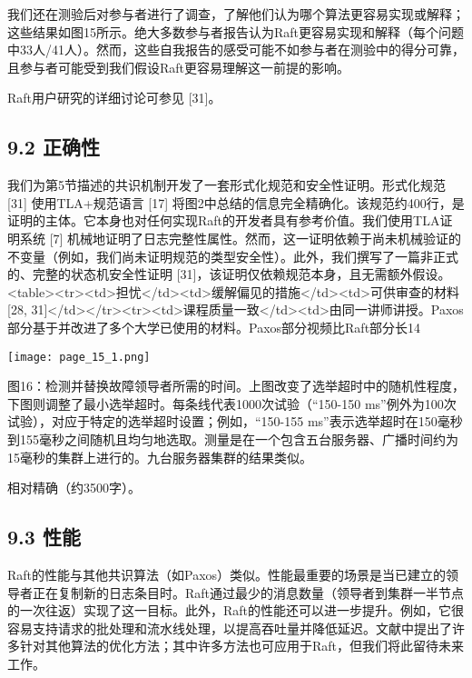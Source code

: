 \documentclass[12pt,a4paper]{report} %
\begin{document}
我们还在测验后对参与者进行了调查，了解他们认为哪个算法更容易实现或解释；这些结果如图15所示。绝大多数参与者报告认为Raft更容易实现和解释（每个问题中33人/41人）。然而，这些自我报告的感受可能不如参与者在测验中的得分可靠，且参与者可能受到我们假设Raft更容易理解这一前提的影响。

Raft用户研究的详细讨论可参见 [31]。

\subsection*{9.2 正确性}

我们为第5节描述的共识机制开发了一套形式化规范和安全性证明。形式化规范 [31] 使用TLA+规范语言 [17] 将图2中总结的信息完全精确化。该规范约400行，是证明的主体。它本身也对任何实现Raft的开发者具有参考价值。我们使用TLA证明系统 [7] 机械地证明了日志完整性属性。然而，这一证明依赖于尚未机械验证的不变量（例如，我们尚未证明规范的类型安全性）。此外，我们撰写了一篇非正式的、完整的状态机安全性证明 [31]，该证明仅依赖规范本身，且无需额外假设。 <table><tr><td>担忧</td><td>缓解偏见的措施</td><td>可供审查的材料 [28, 31]</td></tr><tr><td>课程质量一致</td><td>由同一讲师讲授。Paxos部分基于并改进了多个大学已使用的材料。Paxos部分视频比Raft部分长14%
\begin{center}
\texttt{[image: page\_15\_1.png]}
\end{center}
\begin{center} 图16：检测并替换故障领导者所需的时间。上图改变了选举超时中的随机性程度，下图则调整了最小选举超时。每条线代表1000次试验（“150-150 ms”例外为100次试验），对应于特定的选举超时设置；例如，“150-155 ms”表示选举超时在150毫秒到155毫秒之间随机且均匀地选取。测量是在一个包含五台服务器、广播时间约为15毫秒的集群上进行的。九台服务器集群的结果类似。

\end{center} 相对精确（约3500字）。

\subsection*{9.3 性能}

Raft的性能与其他共识算法（如Paxos）类似。性能最重要的场景是当已建立的领导者正在复制新的日志条目时。Raft通过最少的消息数量（领导者到集群一半节点的一次往返）实现了这一目标。此外，Raft的性能还可以进一步提升。例如，它很容易支持请求的批处理和流水线处理，以提高吞吐量并降低延迟。文献中提出了许多针对其他算法的优化方法；其中许多方法也可应用于Raft，但我们将此留待未来工作。
\end{document}
